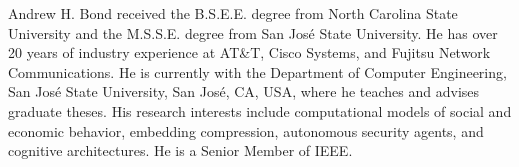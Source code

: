 \documentclass[journal]{IEEEtran}
\begin{document}
\begin{IEEEbiographynophoto}{Andrew H. Bond}
received the B.S.E.E. degree from North Carolina State University and the M.S.S.E. degree from San Jos\'{e} State University. He has over 20 years of industry experience at AT\&T, Cisco Systems, and Fujitsu Network Communications. He is currently with the Department of Computer Engineering, San Jos\'{e} State University, San Jos\'{e}, CA, USA, where he teaches and advises graduate theses. His research interests include computational models of social and economic behavior, embedding compression, autonomous security agents, and cognitive architectures. He is a Senior Member of IEEE.
\end{IEEEbiographynophoto}

\balance
\end{document}

